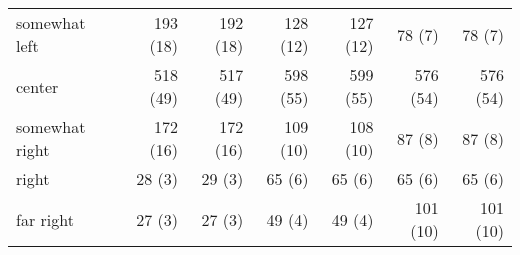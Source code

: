 \begin{table*}
\begin{tabular}[t]{lrrrrrr}
\hspace{1em}somewhat left & 193 (18) & 192 (18) & 128 (12) & 127 (12) & 78 (7) & 78 (7)\\
\hspace{1em}center & 518 (49) & 517 (49) & 598 (55) & 599 (55) & 576 (54) & 576 (54)\\
\hspace{1em}somewhat right & 172 (16) & 172 (16) & 109 (10) & 108 (10) & 87 (8) & 87 (8)\\
\hspace{1em}right & 28 (3) & 29 (3) & 65 (6) & 65 (6) & 65 (6) & 65 (6)\\
\hspace{1em}far right & 27 (3) & 27 (3) & 49 (4) & 49 (4) & 101 (10) & 101 (10)\\
\bottomrule
\end{tabular}
\end{table*}
